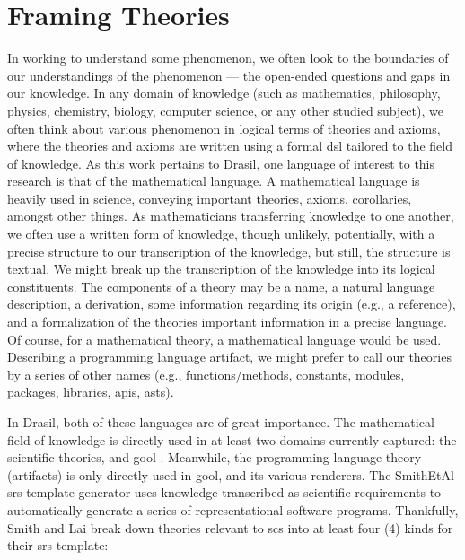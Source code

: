 
\chapter{Framing Theories}
\label{chap:modelkinds}

In working to understand some phenomenon, we often look to the boundaries of our
understandings of the phenomenon — the open-ended questions and gaps in our
knowledge. In any domain of knowledge (such as mathematics, philosophy, physics,
chemistry, biology, computer science, or any other studied subject), we often
think about various phenomenon in logical terms of theories and axioms, where
the theories and axioms are written using a formal \acs{dsl} tailored to the
field of knowledge. As this work pertains to Drasil, one language of interest to
this research is that of the mathematical language. A mathematical language is
heavily used in science, conveying important theories, axioms, corollaries,
amongst other things. As mathematicians transferring knowledge to one another,
we often use a written form of knowledge, though unlikely, potentially, with a
precise structure to our transcription of the knowledge, but still, the
structure is textual. We might break up the transcription of the knowledge into
its logical constituents. The components of a theory may be a name, a natural
language description, a derivation, some information regarding its origin (e.g.,
a reference), and a formalization of the theories important information in a
precise language. Of course, for a mathematical theory, a mathematical language
would be used. Describing a programming language artifact, we might prefer to
call our theories by a series of other names (e.g., functions/methods,
constants, modules, packages, libraries, \acsp{api}, \acsp{ast}).

In Drasil, both of these languages are of great importance. The mathematical
field of knowledge is directly used in at least two domains currently captured:
the scientific theories, and \acs{gool} \cite{Carette2019}. Meanwhile, the
programming language theory (artifacts) is only directly used in \acs{gool}, and
its various renderers. The SmithEtAl \acs{srs} \cite{SmithAndLai2005} template
generator uses knowledge transcribed as scientific requirements to automatically
generate a series of representational software programs. Thankfully, Smith and
Lai \cite{SmithAndLai2005} break down theories relevant to \acs{scs} into at
least four (4) kinds for their \acs{srs} template:

